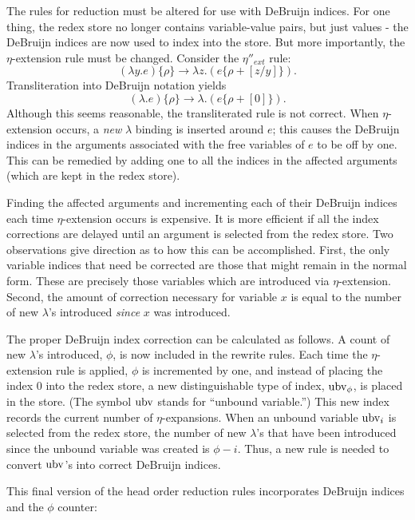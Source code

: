 The rules for reduction must be altered for use with DeBruijn indices. For one
thing, the redex store no longer contains variable-value pairs, but just values
- the DeBruijn indices are now used to index into the store. But more
importantly, the \(\eta\)-extension rule must be changed. Consider the
\(\eta''_{ext}\) rule:
\[
(\lambda y.e)\{\rho\}\longrightarrow \lambda z.(e\{\rho+[z/y]\}).
\]
Transliteration into DeBruijn notation yields
\[
(\lambda.e)\{\rho\}\longrightarrow \lambda.(e\{\rho+[0]\}).
\]
Although this seems reasonable, the transliterated rule is not correct. When
\(\eta\)-extension occurs, a \emph{new} \(\lambda\) binding is inserted around \(e\);
this causes the DeBruijn indices in the arguments associated with the free
variables of \(e\) to be off by one. This can be remedied by adding one to all
the indices in the affected arguments (which are kept in the redex store).

Finding the affected arguments and incrementing each of their DeBruijn indices
each time \(\eta\)-extension occurs is expensive. It is more efficient if all
the index corrections are delayed until an argument is selected from the redex
store. Two observations give direction as to how this can be accomplished.
First, the only variable indices that need be corrected are those that might
remain in the normal form. These are precisely those variables which are
introduced via \(\eta\)-extension. Second, the amount of correction necessary
for variable \(x\) is equal to the number of new \(\lambda\)'s introduced \emph{since}
\(x\) was introduced.

The proper DeBruijn index correction can be calculated as follows. A count of
new \(\lambda\)'s introduced, \(\phi\), is now included in the rewrite rules.
Each time the \(\eta\)-extension rule is applied, \(\phi\) is incremented by
one, and instead of placing the index 0 into the redex store, a new
distinguishable type of index, \(\operatorname{ubv}_\phi\), is placed in the store. (The
symbol \(\operatorname{ubv}\) stands for ``unbound variable.'') This new index records the
current number of \(\eta\)-expansions. When an unbound variable \(\operatorname{ubv}_i\) is
selected from the redex store, the number of new \(\lambda\)'s that have been
introduced since the unbound variable was created is \(\phi-i\). Thus, a new
rule is needed to convert \(\operatorname{ubv}\)'s into correct DeBruijn indices.

This final version of the head order reduction rules incorporates DeBruijn
indices and the \(\phi\) counter:

